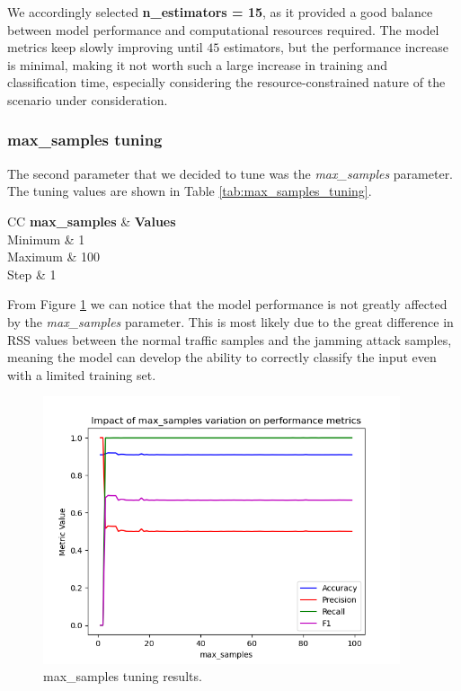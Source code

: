 \documentclass[futureinternet,article,submit,pdftex,moreauthors]{Definitions/mdpi}
\begin{document}
We accordingly selected \textbf{n\_estimators = 15}, as it provided a good balance between model performance and computational resources required.
The model metrics keep slowly improving until $45$ estimators, but the performance increase is minimal, making it not worth such a large increase in training and classification time, especially considering the resource-constrained nature of the scenario under consideration. 

\subsubsection{max\_samples tuning}

The second parameter that we decided to tune was the \textit{max\_samples} parameter. The tuning values are shown in Table \ref{tab:max_samples_tuning}.

\begin{table}[H]
	\caption{max\_samples tuning values.}\label{tab:max_samples_tuning}
	\begin{tabularx}{\textwidth}{CC}
	\toprule
	\textbf{max\_samples} & \textbf{Values} \\
	\midrule
	Minimum & 1 \\
	Maximum & 100 \\
	Step & 1 \\
	\bottomrule
\end{tabularx}
\end{table}

From Figure \ref{fig:max_samples_tuning} we can notice that the model performance is not greatly affected by the \textit{max\_samples} parameter. This is most likely due to the great difference in RSS values between the normal traffic samples and the jamming attack samples, meaning the model can develop the ability to correctly classify the input even with a limited training set.

\begin{figure}[H]
	\centering
	\includegraphics[width=10.5cm]{img/maxSamplesTuning.png}
	\caption{max\_samples tuning results.}\label{fig:max_samples_tuning}
\end{figure}
\unskip
\end{document}
